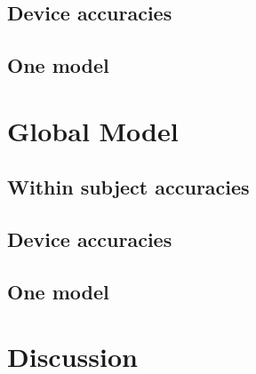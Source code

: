 \subsection{Device accuracies}
\subsection{One model}

\section{Global Model}
\subsection{Within subject accuracies}
\subsection{Device accuracies}
\subsection{One model}

\section{Discussion}
